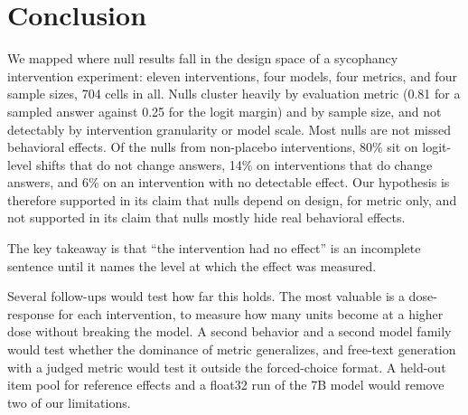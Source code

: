 \section{Conclusion}
\label{sec:conclusion}

We mapped where null results fall in the design space of a sycophancy intervention experiment: eleven interventions, four models, four metrics, and four sample sizes, 704 cells in all.
Nulls cluster heavily by evaluation metric (0.81 for a sampled answer against 0.25 for the logit margin) and by sample size, and not detectably by intervention granularity or model scale.
Most nulls are not missed behavioral effects.
Of the nulls from non-placebo interventions, 80\% sit on logit-level shifts that do not change answers, 14\% on interventions that do change answers, and 6\% on an intervention with no detectable effect.
Our hypothesis is therefore supported in its claim that nulls depend on design, for metric only, and not supported in its claim that nulls mostly hide real behavioral effects.

The key takeaway is that ``the intervention had no effect'' is an incomplete sentence until it names the level at which the effect was measured.

Several follow-ups would test how far this holds.
The most valuable is a dose-response for each intervention, to measure how many \latent units become \behav at a higher dose without breaking the model.
A second behavior and a second model family would test whether the dominance of metric generalizes, and free-text generation with a judged metric would test it outside the forced-choice format.
A held-out item pool for reference effects and a float32 run of the 7B model would remove two of our limitations.
